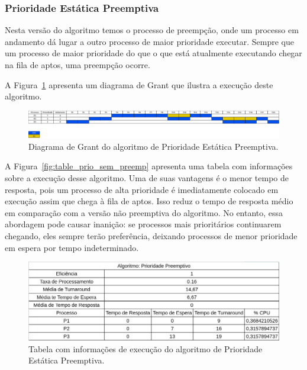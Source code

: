 \documentclass[
	12pt,				%
	oneside,   	        %
	a4paper,			%
	english,			%
	french,				%
	spanish,			%
	brazil,				%
	]{pacotes/abntex2}
\begin{document}
\subsubsection{Prioridade Estática Preemptiva}
\label{subsubsec:prio_preemp}

Nesta versão do algoritmo temos o processo de preempção, onde um processo em andamento dá lugar a outro processo de maior prioridade executar. Sempre que um processo de maior prioridade do que o que está atualmente executando chegar na fila de aptos, uma preempção ocorre.

 A Figura~\ref{fig:prio_preemp} apresenta um diagrama de Grant que ilustra a execução deste algoritmo.

\begin{figure}[H]
  \centering
  \includegraphics[scale=0.20]{figuras/ex2/prio_preemp.png}
  \caption{Diagrama de Grant do algoritmo de Prioridade Estática Preemptiva.}
  \label{fig:prio_preemp}
\end{figure}

A Figura~\ref{fig:table_prio_sem_preemp} apresenta uma tabela com informações sobre a execução desse algoritmo. Uma de suas vantagens é o menor tempo de resposta, pois um processo de alta prioridade é imediatamente colocado em execução assim que chega à fila de aptos. Isso reduz o tempo de resposta médio em comparação com a versão não preemptiva do algoritmo. No entanto, essa abordagem pode causar inanição: se processos mais prioritários continuarem chegando, eles sempre terão preferência, deixando processos de menor prioridade em espera por tempo indeterminado.

\begin{figure}[H]
  \centering
  \includegraphics[scale=0.5]{figuras/ex2/table_prio_preemp.png}
  \caption{Tabela com informações de execução do algoritmo de Prioridade Estática Preemptiva.}
  \label{fig:table_prio_preemp}
\end{figure}
\end{document}
